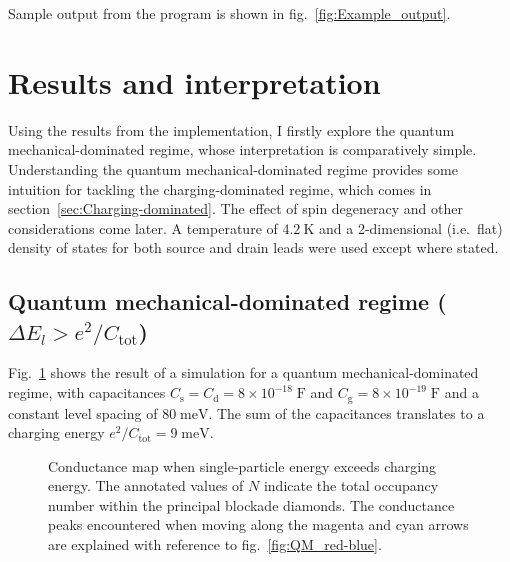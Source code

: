\documentclass[a4paper,11pt]{article}
\begin{document}
    Sample output from the program is shown in fig.~\ref{fig:Example_output}.


    \newpage
    \section{Results and interpretation}
    Using the results from the implementation, I firstly explore the quantum mechanical-dominated regime, whose interpretation is comparatively simple. Understanding the quantum mechanical-dominated regime provides some intuition for tackling the charging-dominated regime, which comes in section~\ref{sec:Charging-dominated}. The effect of spin degeneracy and other considerations come later. A temperature of $4.2~\mathrm{K}$ and a 2-dimensional (i.e.\ flat) density of states for both source and drain leads were used except where stated.

    \subsection{Quantum mechanical-dominated regime ($\Delta E_l > e^2/C_\mathrm{tot}$)}

    Fig.~\ref{fig:QM-dominated} shows the result of a simulation for a quantum mechanical-dominated regime, with capacitances $C_\mathrm{s} = C_\mathrm{d} = 8\times10^{-18}\;\mathrm{F}$ and $C_\mathrm{g} = 8\times10^{-19}\;\mathrm{F}$ and a constant level spacing of $80\;\mathrm{meV}$. The sum of the capacitances translates to a charging energy $e^2/C_\mathrm{tot} = 9\;\mathrm{meV}$.

    \begin{figure}[h!]
    \begin{center}
        \caption{Conductance map when single-particle energy exceeds charging energy. The annotated values of $N$ indicate the total occupancy number within the principal blockade diamonds. The conductance peaks encountered when moving along the magenta and cyan arrows are explained with reference to fig.~\ref{fig:QM_red-blue}.}
        \label{fig:QM-dominated}
    \end{center}
    \end{figure}
\end{document}
